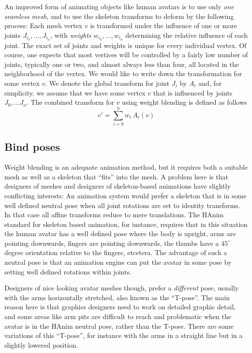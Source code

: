  An improved form of animating objects like human avatars is to use only \emph{one seamless mesh},
 and to use the skeleton transforms to deform by the following process:
 Each mesh vertex $v$ is transformed under the influence of one or more joints $J_{i_0}, \ldots, J_{i_n}$,
 with \emph{weights} $w_{i_0}, \ldots, w_{i_n}$ determining the relative influence of each joint.
 The exact set of joints and weights is unique for every individual vertex. Of course, one expects
 that most vertices will be controlled by a fairly low number of joints, typically one or two, and almost always less than four,
 all located in the neighborhood of the vertex. We would like to write down the transformation for some vertex $v$.
 We denote the global transform for joint $J_i$ by $A_i$ and, for simplicity, we assume that we have some vertex $v$
 that is influenced by joints $J_0, \ldots J_n$.
 The combined transform for $v$ using weight blending is defined as follows
%
\begin{equation}\label{eq:weightblending-simple}
 v' = \sum_{i=0}^{n} w_i\, A_i(v)
\end{equation}

\subsection{Bind poses}
Weight blending is an adequate animation method, but it requires both a suitable mesh as well
as a skeleton that ``fits'' into the mesh. A problem here is that designers of meshes and designers
of skeleton-based animations have slightly conflicting interests:
An animation system would prefer a skeleton that is in some well defined neutral pose
when all joint rotations are set to identity transforms. In that case all affine transforms
reduce to mere translations. The HAnim standard for skeleton based animation, for instance,
requires that in this situation the human avatar has a well defined pose where the body is upright,
arms are pointing downwards, fingers are pointing downwards, the thumbs have a $45^\circ$ degree orientation
relative to the fingers, etcetera.
The advantage of such a neutral pose is that an animation engine can put the avatar in some pose by setting well defined
rotations within joints.

Designers of nice looking avatar meshes though, prefer a \emph{different} pose, usually with the arms
horizontally stretched, also known as the ``T-pose''. The main reason here is that graphics designers
need to work on detailed graphic detail, and some areas like arm pits are difficult to reach and problematic when
the avatar is in the HAnim neutral pose, rather than the T-pose.
There are some variations of this ``T-pose'', for instance with the arms in a straight line but in a slightly lowered
position.

